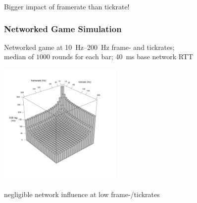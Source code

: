 \documentclass{UDEbeamerEN}
\begin{document}
\begin{frame}
\begin{overprint}
{\begin{center}
			Bigger impact of framerate than tickrate!
			\end{center}}
	\end{overprint}


\end{frame}


\begin{frame}
	\frametitle{Networked Game Simulation}

	\begin{center}
	\vspace{-9mm}
		Networked game at \SIrange{10}{200}{\hertz} frame- and tickrates; \\
		median of $1000$ rounds for each bar; \SI{40}{\milli\second} base network RTT

		\includegraphics[height=6cm]{../../../simulation/visualization/e2e-lag-3dbars.pdf}
		\vspace{-10mm}

		negligible network influence at low frame-/tickrates

	\end{center}

\end{frame}
\end{document}
